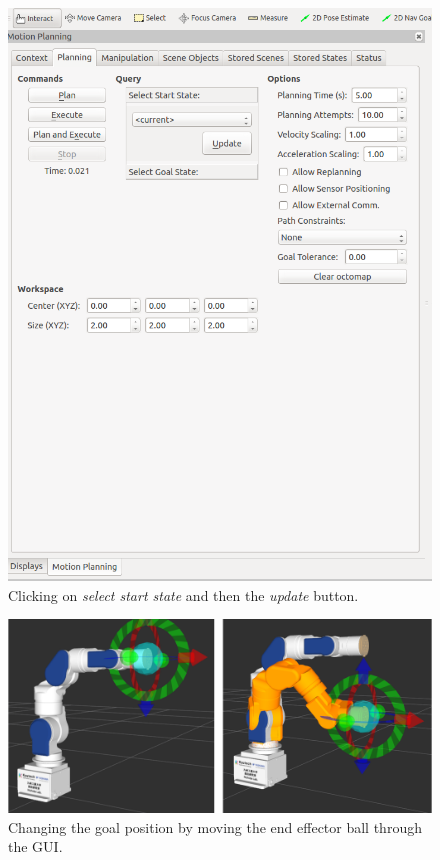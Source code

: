 \begin{figure}
\includegraphics[scale=0.23]{images/motion_planning/gui_moving_procedure_4.png}
\centering
\caption{Clicking on \emph{select start state} and then the \emph{update} button.}
\label{fig:gui_procedure_2}
\end{figure}

\begin{figure}
\includegraphics[scale=0.27]{images/motion_planning/gui_end_effector.png}
\centering
\caption{Changing the goal position by moving the end effector ball through the GUI.}
\label{fig:gui_end_effector}
\end{figure}

